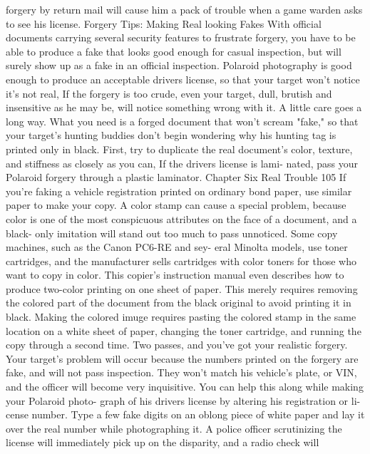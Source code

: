 \documentclass{book}
\begin{document}
forgery by return mail will cause him a pack of trouble when a 
game warden asks to see his license. 
Forgery Tips: 
Making Real looking Fakes 
With official documents carrying several security features to 
frustrate forgery, you have to be able to produce a fake that 
looks good enough for casual inspection, but will surely show 
up as a fake in an official inspection. Polaroid photography is 
good enough to produce an acceptable drivers license, so that 
your target won't notice it’s not real, 
If the forgery is too crude, even your target, dull, brutish 
and insensitive as he may be, will notice something wrong with 
it. A little care goes a long way. What you need is a forged 
document that won't scream "fake," so that your target's hunting 
buddies don't begin wondering why his hunting tag is printed 
only in black. 
First, try to duplicate the real document's color, texture, and 
stiffness as closely as you can, If the drivers license is lami- 
nated, pass your Polaroid forgery through a plastic laminator. 
Chapter Six 
Real Trouble 
105 
If you're faking a vehicle registration printed on ordinary 
bond paper, use similar paper to make your copy. A color stamp 
can cause a special problem, because color is one of the most 
conspicuous attributes on the face of a document, and a black- 
only imitation will stand out too much to pass unnoticed. 
Some copy machines, such as the Canon PC6-RE and sey- 
eral Minolta models, use toner cartridges, and the manufacturer 
sells cartridges with color toners for those who want to copy in 
color. This copier's instruction manual even describes how to 
produce two-color printing on one sheet of paper. This merely 
requires removing the colored part of the document from the 
black original to avoid printing it in black. Making the colored 
imuge requires pasting the colored stamp in the same location 
on a white sheet of paper, changing the toner cartridge, and 
running the copy through a second time. Two passes, and 
you've got your realistic forgery. 
Your target's problem will occur because the numbers 
printed on the forgery are fake, and will not pass inspection. 
They won't match his vehicle's plate, or VIN, and the officer 
will become very inquisitive. 
You can help this along while making your Polaroid photo- 
graph of his drivers license by altering his registration or li- 
cense number. Type a few fake digits on an oblong piece of 
white paper and lay it over the real number while 
photographing it. A police officer scrutinizing the license will 
immediately pick up on the disparity, and a radio check will 
\end{document}
